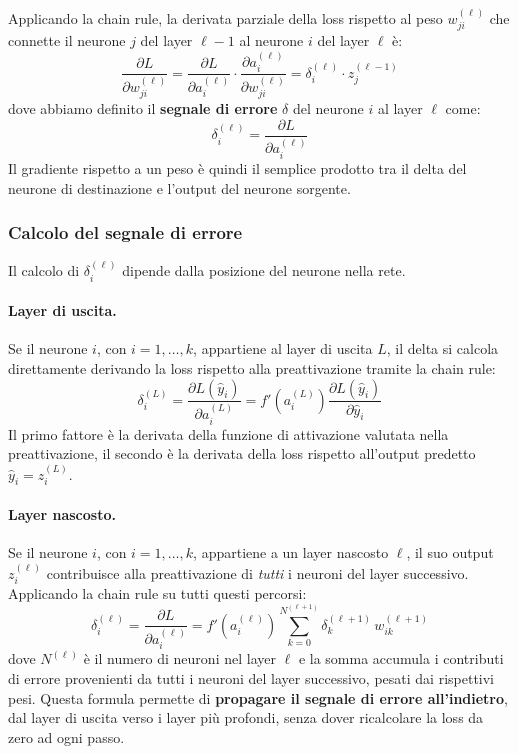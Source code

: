 Applicando la chain rule, la derivata parziale della loss rispetto al peso $w_{ji}^{(\ell)}$ che connette il neurone $j$ del layer $\ell-1$ al neurone $i$ del layer $\ell$ è:
\[
\frac{\partial L}{\partial w_{ji}^{(\ell)}}= \frac{\partial L}{\partial a_i^{(\ell)}}\cdot \frac{\partial a_i^{(\ell)}}{\partial w_{ji}^{(\ell)}}=\delta_i^{(\ell)}\cdot z_j^{(\ell-1)}
\]
dove abbiamo definito il \textbf{segnale di errore} $\delta$ del neurone $i$ al layer $\ell$ come:
\[
\delta_i^{(\ell)}=\frac{\partial L}{\partial a_i^{(\ell)}}
\]
Il gradiente rispetto a un peso è quindi il semplice prodotto tra il delta del neurone di destinazione e l'output del neurone sorgente.

\subsubsection{Calcolo del segnale di errore}

Il calcolo di $\delta_i^{(\ell)}$ dipende dalla posizione del neurone nella rete.

\paragraph{Layer di uscita.}
Se il neurone $i$, con $i = 1, \ldots, k$, appartiene al layer di uscita $L$, il delta si calcola direttamente derivando la loss rispetto alla preattivazione tramite la chain rule:
\[
\delta_i^{(L)} = \frac{\partial L(\hat{y}_i)}{\partial a_i^{(L)}} = f'\!\left(a_i^{(L)}\right) \frac{\partial L(\hat{y}_i)}{\partial \hat{y}_i}
\]
Il primo fattore è la derivata della funzione di attivazione valutata nella preattivazione, il secondo è la derivata della loss rispetto all'output predetto $\hat{y}_i=z_i^{(L)}$.

\paragraph{Layer nascosto.}
Se il neurone $i$, con $i = 1, \ldots, k$, appartiene a un layer nascosto $\ell$, il suo output $z_i^{(\ell)}$ contribuisce alla preattivazione di \emph{tutti} i neuroni del layer successivo. Applicando la chain rule su tutti questi percorsi:
\[
\delta_i^{(\ell)} = \frac{\partial L}{\partial a_i^{(\ell)}} = f'\!\left(a_i^{(\ell)}\right) \sum_{k=0}^{N^{(\ell+1)}} \delta_k^{(\ell+1)}\, w_{ik}^{(\ell+1)}
\]
dove $N^{(\ell)}$ è il numero di neuroni nel layer $\ell$ e la somma accumula i contributi di errore provenienti da tutti i neuroni del layer successivo, pesati dai rispettivi pesi. Questa formula permette di \textbf{propagare il segnale di errore all'indietro}, dal layer di uscita verso i layer più profondi, senza dover ricalcolare la loss da zero ad ogni passo.

